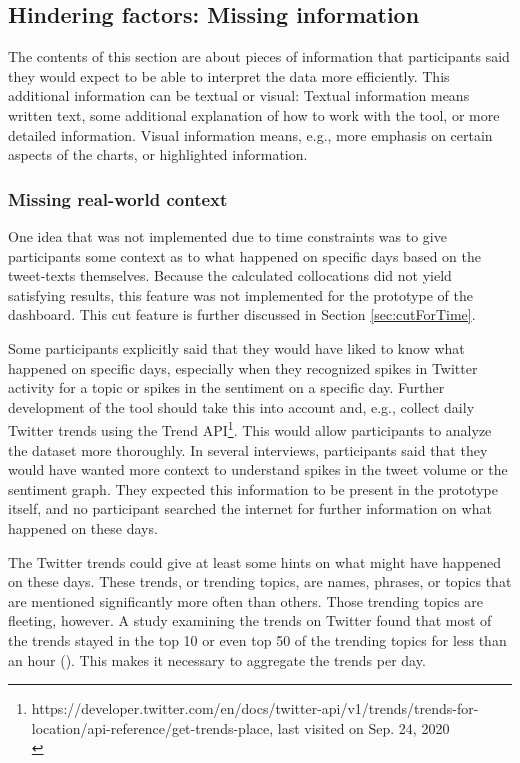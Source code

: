 \subsection{Hindering factors: Missing information}
The contents of this section are about pieces of information that participants said they would expect to be able to interpret the data more efficiently. This additional information can be textual or visual: Textual information means written text, some additional explanation of how to work with the tool, or more detailed information. Visual information means, e.g., more emphasis on certain aspects of the charts, or highlighted information.

\subsubsection*{Missing real-world context}
One idea that was not implemented due to time constraints was to give participants some context as to what happened on specific days based on the tweet-texts themselves. Because the calculated collocations did not yield satisfying results, this feature was not implemented for the prototype of the dashboard. This cut feature is further discussed in Section \ref{sec:cutForTime}.

Some participants explicitly said that they would have liked to know what happened on specific days, especially when they recognized spikes in Twitter activity for a topic or spikes in the sentiment on a specific day. Further development of the tool should take this into account and, e.g., collect daily Twitter trends using the Trend API\footnote{https://developer.twitter.com/en/docs/twitter-api/v1/trends/trends-for-location/api-reference/get-trends-place, last visited on Sep. 24, 2020 \\}. This would allow participants to analyze the dataset more thoroughly. In several interviews, participants said that they would have wanted more context to understand spikes in the tweet volume or the sentiment graph. They expected this information to be present in the prototype itself, and no participant searched the internet for further information on what happened on these days.

The Twitter trends could give at least some hints on what might have happened on these days. These trends, or trending topics, are names, phrases, or topics that are mentioned significantly more often than others. Those trending topics are fleeting, however. A study examining the trends on Twitter found that most of the trends stayed in the top 10 or even top 50 of the trending topics for less than an hour (\cite{annamoradnejadComprehensiveAnalysisTwitter2019}). This makes it necessary to aggregate the trends per day.


